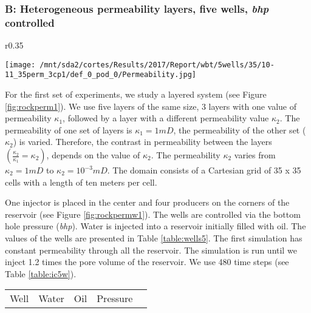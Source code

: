\documentclass[12pt]{article}
\begin{document}
{\subsubsection*{B: Heterogeneous permeability layers, five wells, \emph{bhp} controlled}
\begin{wrapfigure}{r}{0.35\textwidth}  \vspace{-0.5cm} \hspace{-0.5cm}
\begin{minipage}{.4\textwidth}
\centering
\texttt{[image: /mnt/sda2/cortes/Results/2017/Report/wbt/5wells/35/10-11\_35perm\_3cp1/def\_0\_pod\_0/Permeability.jpg]}
\caption{Rock permeability}
\label{fig:rockpermw1}
\end{minipage}%
\vspace{-0.5cm}
\end{wrapfigure}
\hspace{0.5cm}For the first set of experiments, we study a layered system (see Figure \ref{fig:rockperm1}). We use five layers of the same size, 
3 layers with one value of permeability $\kappa_1$, followed by a layer with a different permeability value $\kappa_2$. The permeability of one set of layers is $\kappa_1=1mD$, the permeability of the other set ($\kappa_2$) is varied. 
Therefore, the contrast in permeability between the layers $(\frac{\kappa_2}{\kappa_1}=\kappa_2)$,
depends on the value of $\kappa_2$.
The permeability $\kappa_2$ varies from $\kappa_2=1mD$ to $\kappa_2=10^{-3}mD$. 
The domain consists of a Cartesian grid of 35 x 35 cells with a length of ten meters per cell. \par
One injector is placed in the center and four producers on the corners of the reservoir (see Figure \ref{fig:rockpermw1}). 
The wells are controlled via the bottom hole pressure (\emph{bhp}). 
 Water is injected into a reservoir initially filled with oil. The values of the wells are presented in Table \ref{table:wells5}. 
 The first simulation has constant permeability through all the reservoir. The simulation is run until we inject 1.2 times the 
 pore volume of the reservoir. We use 480 time steps (see Table \ref{table:ic5w}).   \par 
\begin{table}[!ht]
\hspace{-0cm}
\begin{minipage}{.5\textwidth}
\centering
\begin{tabular}{ |c|c|c|c|c|} 
\hline
Well&Water &Oil &Pressure\\

\end{tabular}
\end{minipage}
\end{table}}
\end{document}
